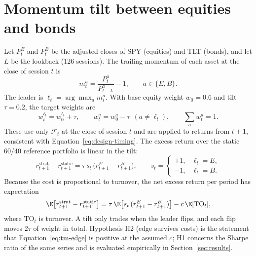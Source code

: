 \section{Momentum tilt between equities and bonds}\label{sec:thesis-math}

Let \(P^{E}_t\) and \(P^{B}_t\) be the adjusted closes of SPY (equities) and TLT (bonds), and let
\(L\) be the lookback (126 sessions). The trailing momentum of each asset at the close of session
\(t\) is
\begin{equation}
  m^{a}_t=\frac{P^{a}_{t}}{P^{a}_{t-L}}-1,\qquad a\in\{E,B\}.
  \label{eq:tm-momentum}
\end{equation}
The leader is \(\ell_t=\arg\max_a m^a_t\). With base equity weight \(w_0=0.6\) and tilt
\(\tau=0.2\), the target weights are
\begin{equation}
  w^{\ell_t}_t=w^{\ell_t}_0+\tau,\qquad
  w^{a}_t=w^{a}_0-\tau\ \ (a\ne\ell_t),\qquad
  \sum_a w^a_t=1.
  \label{eq:tm-weights}
\end{equation}
These use only \(\mathcal F_{t}\) at the close of session \(t\) and are applied to returns from
\(t+1\), consistent with Equation~\eqref{eq:design-timing}. The excess return over the static
60/40 reference portfolio is linear in the tilt:
\begin{equation}
  r^{\mathrm{strat}}_{t+1}-r^{\mathrm{static}}_{t+1}
  =\tau\,s_t\,\bigl(r^{E}_{t+1}-r^{B}_{t+1}\bigr),\qquad
  s_t=\begin{cases}+1,& \ell_t=E,\\-1,& \ell_t=B.\end{cases}
  \label{eq:tm-excess}
\end{equation}
Because the cost is proportional to turnover, the net excess return per period has expectation
\begin{equation}
  \E\!\left[r^{\mathrm{strat}}_{t+1}-r^{\mathrm{static}}_{t+1}\right]
  =\tau\,\E\!\left[s_t\,(r^{E}_{t+1}-r^{B}_{t+1})\right]-c\,\E[\mathrm{TO}_t],
  \label{eq:tm-edge}
\end{equation}
where \(\mathrm{TO}_t\) is turnover. A tilt only trades when the leader flips, and each flip moves
\(2\tau\) of weight in total. Hypothesis H2 (edge survives costs) is the statement that
Equation~\eqref{eq:tm-edge} is positive at the assumed \(c\); H1 concerns the Sharpe ratio of the
same series and is evaluated empirically in Section~\ref{sec:results}.
